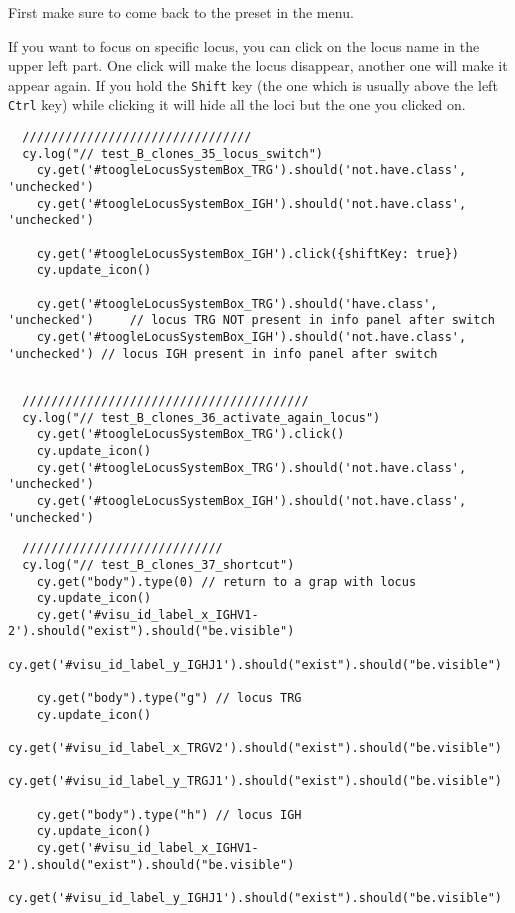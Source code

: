 First make sure to come back to the preset  in the  menu.

If you want to focus on specific locus, you can click on the locus name in
the upper left part. One click will make the locus disappear, another one will
make it appear again.
If you hold the \texttt{Shift} key (the one which is usually above the left
\texttt{Ctrl} key) while clicking it will hide all the loci but the one you
clicked on.

\begin{verbatim}
  ////////////////////////////////
  cy.log("// test_B_clones_35_locus_switch")
    cy.get('#toogleLocusSystemBox_TRG').should('not.have.class', 'unchecked')
    cy.get('#toogleLocusSystemBox_IGH').should('not.have.class', 'unchecked')

    cy.get('#toogleLocusSystemBox_IGH').click({shiftKey: true})
    cy.update_icon()

    cy.get('#toogleLocusSystemBox_TRG').should('have.class', 'unchecked')     // locus TRG NOT present in info panel after switch
    cy.get('#toogleLocusSystemBox_IGH').should('not.have.class', 'unchecked') // locus IGH present in info panel after switch


\end{verbatim}

\begin{verbatim}
  ////////////////////////////////////////
  cy.log("// test_B_clones_36_activate_again_locus")
    cy.get('#toogleLocusSystemBox_TRG').click()
    cy.update_icon()
    cy.get('#toogleLocusSystemBox_TRG').should('not.have.class', 'unchecked')
    cy.get('#toogleLocusSystemBox_IGH').should('not.have.class', 'unchecked')

\end{verbatim}

\begin{verbatim}
  ////////////////////////////
  cy.log("// test_B_clones_37_shortcut")
    cy.get("body").type(0) // return to a grap with locus 
    cy.update_icon()
    cy.get('#visu_id_label_x_IGHV1-2').should("exist").should("be.visible")
    cy.get('#visu_id_label_y_IGHJ1').should("exist").should("be.visible")

    cy.get("body").type("g") // locus TRG
    cy.update_icon()
    cy.get('#visu_id_label_x_TRGV2').should("exist").should("be.visible")
    cy.get('#visu_id_label_y_TRGJ1').should("exist").should("be.visible")

    cy.get("body").type("h") // locus IGH
    cy.update_icon()
    cy.get('#visu_id_label_x_IGHV1-2').should("exist").should("be.visible")
    cy.get('#visu_id_label_y_IGHJ1').should("exist").should("be.visible")


\end{verbatim}

